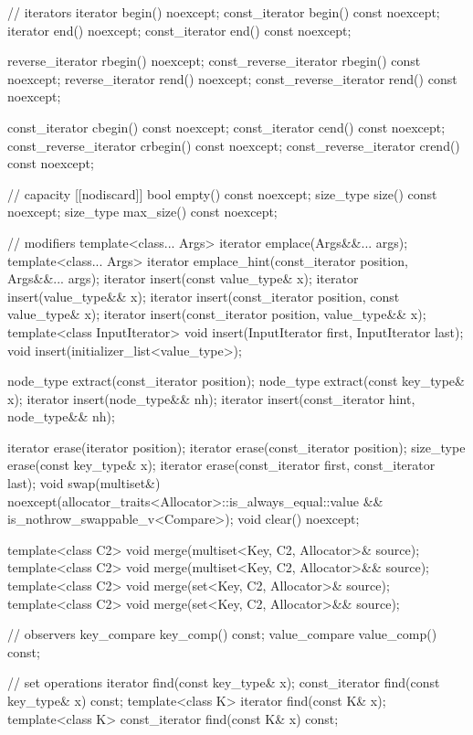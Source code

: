 \begin{codeblock}
{{    // iterators
    iterator               begin() noexcept;
    const_iterator         begin() const noexcept;
    iterator               end() noexcept;
    const_iterator         end() const noexcept;

    reverse_iterator       rbegin() noexcept;
    const_reverse_iterator rbegin() const noexcept;
    reverse_iterator       rend() noexcept;
    const_reverse_iterator rend() const noexcept;

    const_iterator         cbegin() const noexcept;
    const_iterator         cend() const noexcept;
    const_reverse_iterator crbegin() const noexcept;
    const_reverse_iterator crend() const noexcept;

    // capacity
    [[nodiscard]] bool empty() const noexcept;
    size_type size() const noexcept;
    size_type max_size() const noexcept;

    // modifiers
    template<class... Args> iterator emplace(Args&&... args);
    template<class... Args> iterator emplace_hint(const_iterator position, Args&&... args);
    iterator insert(const value_type& x);
    iterator insert(value_type&& x);
    iterator insert(const_iterator position, const value_type& x);
    iterator insert(const_iterator position, value_type&& x);
    template<class InputIterator>
      void insert(InputIterator first, InputIterator last);
    void insert(initializer_list<value_type>);

    node_type extract(const_iterator position);
    node_type extract(const key_type& x);
    iterator insert(node_type&& nh);
    iterator insert(const_iterator hint, node_type&& nh);

    iterator  erase(iterator position);
    iterator  erase(const_iterator position);
    size_type erase(const key_type& x);
    iterator  erase(const_iterator first, const_iterator last);
    void      swap(multiset&)
      noexcept(allocator_traits<Allocator>::is_always_equal::value &&
               is_nothrow_swappable_v<Compare>);
    void      clear() noexcept;

    template<class C2>
      void merge(multiset<Key, C2, Allocator>& source);
    template<class C2>
      void merge(multiset<Key, C2, Allocator>&& source);
    template<class C2>
      void merge(set<Key, C2, Allocator>& source);
    template<class C2>
      void merge(set<Key, C2, Allocator>&& source);

    // observers
    key_compare key_comp() const;
    value_compare value_comp() const;

    // set operations
    iterator       find(const key_type& x);
    const_iterator find(const key_type& x) const;
    template<class K> iterator       find(const K& x);
    template<class K> const_iterator find(const K& x) const;

}}
\end{codeblock}
